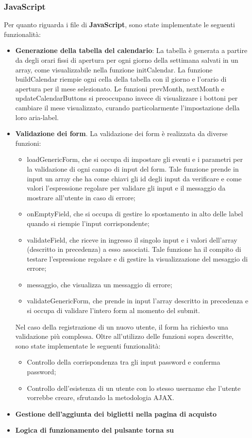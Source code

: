 \subsubsection{JavaScript}
Per quanto riguarda i file di \textbf{JavaScript}, sono state implementate le seguenti funzionalità:
\begin{itemize}
    \item \textbf{Generazione della tabella del calendario}:
        La tabella è generata a partire da degli orari fissi di apertura per ogni giorno della settimana salvati in un array, come visualizzabile nella funzione initCalendar. La funzione buildCalendar riempie ogni cella della tabella con il giorno e l'orario di apertura per il mese selezionato. Le funzioni prevMonth, nextMonth e updateCalendarButtons si preoccupano invece di visualizzare i bottoni per cambiare il mese visualizzato, curando particolarmente l'impostazione della loro aria-label.
    \item \textbf{Validazione dei form}. La validazione dei form è realizzata da diverse funzioni:
    \begin{itemize}
        \item loadGenericForm, che si occupa di impostare gli eventi e i parametri per la validazione di ogni campo di input del form. Tale funzione prende in input un array che ha come chiavi gli id degli input da verificare e come valori l'espressione regolare per validare gli input e il messaggio da mostrare all'utente in caso di errore;
        \item onEmptyField, che si occupa di gestire lo spostamento in alto delle label quando si riempie l'input corrispondente;
        \item validateField, che riceve in ingresso il singolo input e i valori dell'array (descritto in precedenza) a esso associati. Tale funzione ha il compito di testare l'espressione regolare e di gestire la visualizzazione del mesaggio di errore;
        \item messaggio, che visualizza un messaggio di errore;
        \item validateGenericForm, che prende in input l'array descritto in precedenza e si 
        occupa di validare l'intero form al momento del submit.
    \end{itemize}
        Nel caso della registrazione di un nuovo utente, il form ha richiesto una validazione più complessa. Oltre all'utilizzo delle funzioni sopra descritte, sono state implementate le seguenti funzionalità:
        \begin{itemize}
            \item Controllo della corrispondenza tra gli input password e conferma password;
            \item Controllo dell'esistenza di un utente con lo stesso username che l'utente vorrebbe creare, sfrutando la metodologia AJAX.
        \end{itemize}
    
    \item \textbf{Gestione dell'aggiunta dei biglietti nella pagina di acquisto}
    \item \textbf{Logica di funzionamento del pulsante torna su}
\end{itemize}

